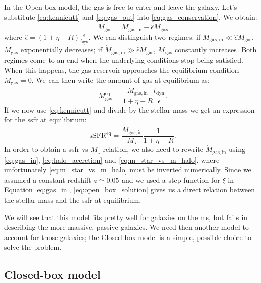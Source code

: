 \documentclass[fleqn, usenatbib]{mnras}
\begin{document}
In the Open-box model, the gas is free to enter and leave the galaxy. Let's substitute \eqref{eq:kennicutt} and \eqref{eq:gas_out} into \eqref{eq:gas_conservation}. We obtain:
\begin{equation} \label{eq:open_box}
	\dot{M}_{\mathrm{gas}} = \dot{M}_{\mathrm{gas, in}} - \hat{\epsilon} M_{\mathrm{gas}}
\end{equation}
where \(\hat{\epsilon} = (1 + \eta - R) \frac{\epsilon}{t_{\mathrm{dyn}}}\). We can distinguish two regimes: if \(\dot{M}_{\mathrm{gas, in}} \ll \hat{\epsilon} M_{\mathrm{gas}}\), \(M_{\mathrm{gas}}\) exponentially decreases; if \(\dot{M}_{\mathrm{gas, in}} \gg \hat{\epsilon} M_{\mathrm{gas}}\), \(M_{\mathrm{gas}}\) constantly increases. Both regimes come to an end when the underlying conditions stop being satisfied. When this happens, the gas reservoir approaches the equilibrium condition \(\dot{M}_{\mathrm{gas}} = 0\). We can then write the amount of gas at equilibrium as:
\begin{equation} \label{eq:open_box_gas_eq}
	M_{\mathrm{gas}}^{\mathrm{eq}} = \frac{\dot{M}_{\mathrm{gas, in}}}{1 + \eta - R} \frac{t_{\mathrm{dyn}}}{\epsilon}.
\end{equation}
If we now use \eqref{eq:kennicutt} and divide by the stellar mass we get an expression for the \acrlong{ssfr} at equilibrium:
\begin{equation} \label{eq:open_box_solution}
	\mathrm{sSFR}^{\mathrm{eq}} = \frac{\dot{M}_{\mathrm{gas, in}}}{M_{\star}} \frac{1}{1 + \eta - R}.
\end{equation}
In order to obtain a \acrshort{ssfr} vs \(M_{\star}\) relation, we also need to rewrite \(\dot{M}_{\mathrm{gas, in}}\) using \eqref{eq:gas_in}, \eqref{eq:halo_accretion} and \eqref{eq:m_star_vs_m_halo}, where unfortunately \eqref{eq:m_star_vs_m_halo} must be inverted numerically. Since we assumed a constant redshift \(z \simeq 0.05\) and we used a step function for \(\xi\) in Equation \ref{eq:gas_in}, \eqref{eq:open_box_solution} gives us a direct relation between the stellar mass and the \acrlong{ssfr} at equilibrium.

We will see that this model fits pretty well for galaxies on the \acrlong{ms}, but fails in describing the more massive, passive galaxies. We need then another model to account for those galaxies; the Closed-box model is a simple, possible choice to solve the problem.

\subsection{Closed-box model}
\end{document}

